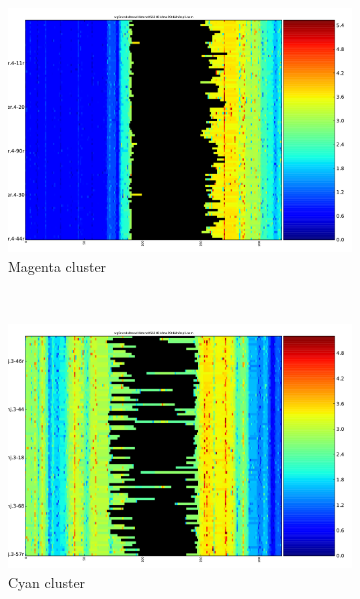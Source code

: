 \documentclass[parskip]{cs4rep}
\begin{document}
\begin{figure}[t,b]
    \centering
    \begin{subfigure}[b]{0.22\textwidth}
        \includegraphics[width=\textwidth]{figures/evaluation/exon_stretching/cluster-warped-1.pdf}
        \caption{Magenta cluster}
        \label{fig:evaluation:exon_stretching:clusters:1:warped}
    \end{subfigure}
    ~
    \begin{subfigure}[b]{0.22\textwidth}
        \includegraphics[width=\textwidth]{figures/evaluation/exon_stretching/cluster-warped-2.pdf}
        \caption{Cyan cluster}
        \label{fig:evaluation:exon_stretching:clusters:2:warped}
    \end{subfigure}
    ~
    \begin{subfigure}[b]{0.22\textwidth}

\end{subfigure}
\end{figure}
\end{document}
